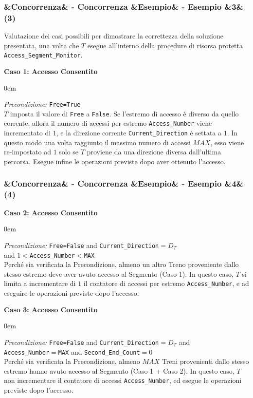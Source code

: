 \documentclass[slidestop,compress,blackandwhite]{beamer}
\newcommand{\ttt}[1]{\texttt{#1}}
\newcommand{\ii}[1]{\textit{#1}}
\newcommand{\cm}[1]{\vspace{#1cm}}
\newcommand{\describe}[2]{
	\textbf{#1}\\
	\begin{addmargin}[2em]{0em}
		#2
	\end{addmargin}
}
\newcommand{\newtitle}[4]{
	#1 
	\ifx&#2&%
	\else
  		\large- #2
	\fi
	\ifx&#3&%
	\else
  		\normalsize- #3
	\fi
	\ifx&#4&%
	\else
  		\normalsize (#4)
	\fi
}
\newcommand{\newframe}[5]{
	\begin{frame}
		\frametitle{\newtitle{#1}{#2}{#3}{#4}}
		#5
	\end{frame}
}
\begin{document}
	
	\newframe{}{Concorrenza}{Esempio}{3}{
		\footnotesize
		\cm{0.5}
		\justifying Valutazione dei casi possibili per dimostrare la correttezza della soluzione presentata, una volta che $T$ esegue all'interno della procedure di risorsa protetta \ttt{Access\_Segment\_Monitor}.\\
		\cm{0.3}
		\describe{\footnotesize Caso 1: Accesso Consentito}{
			\footnotesize
			\justifying
			\ii{Precondizione:} \ttt{Free=True}\\
			$T$ imposta il valore di \ttt{Free} a \ttt{False}. Se l'estremo di accesso è diverso da quello corrente, allora il numero di accessi per estremo \ttt{Access\_Number} viene incrementato di $1$, e la direzione corrente \ttt{Current\_Direction} è settata a $1$. In questo modo una volta raggiunto il massimo numero di accessi $MAX$, esso viene re-impostato ad $1$ solo se $T$ proviene da una direzione diversa dall'ultima percorsa. Esegue infine le operazioni previste dopo aver ottenuto l'accesso.
		}
	}
	
	
	\newframe{}{Concorrenza}{Esempio}{4}{
		\describe{\footnotesize Caso 2: Accesso Consentito}{
			\footnotesize
			\justifying
			\ii{Precondizione:} \ttt{Free=False} and \ttt{Current\_Direction}$= D_T$ \\and $1<$\ttt{Access\_Number}$<$\ttt{MAX} \\
			Perché sia verificata la Precondizione, almeno un altro Treno proveniente dallo stesso estremo deve aver avuto accesso al Segmento (Caso 1). In questo caso, $T$ si limita a incrementare di $1$ il contatore di accessi per estremo \ttt{Access\_Number}, e ad eseguire le operazioni previste dopo l'accesso.
		}
		\describe{\footnotesize Caso 3: Accesso Consentito}{
			\footnotesize
			\justifying
			\ii{Precondizione:} \ttt{Free=False} and \ttt{Current\_Direction}$= D_T$ and \\\ttt{Access\_Number}$=$\ttt{MAX} and \ttt{Second\_End\_Count}$=0$ \\
			Perché sia verificata la Precondizione, almeno $MAX$ Treni provenienti dallo stesso estremo hanno avuto accesso al Segmento (Caso 1 + Caso 2). In questo caso, $T$ non incrementare il contatore di accessi \ttt{Access\_Number}, ed esegue le operazioni previste dopo l'accesso.
		}
	}
	
\end{document}
